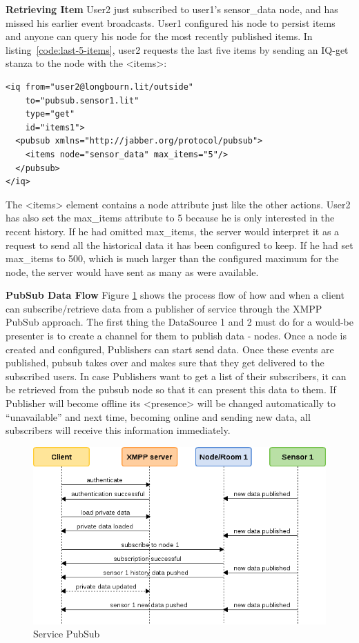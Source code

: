 \textbf{Retrieving Item}
\newline
User2 just subscribed to user1's sensor\_data node, and has missed his earlier event broadcasts.  User1 configured his node to persist items and anyone can query his node for the most recently published items. In listing~\ref{code:last-5-items}, user2 requests the last five items by sending an IQ-get stanza to the node with the <items>:
\begin{lstlisting}[label=code:last-5-items,caption=PubSub: requesting last 5 items from history]
<iq from="user2@longbourn.lit/outside"
    to="pubsub.sensor1.lit"
    type="get"
    id="items1">
  <pubsub xmlns="http://jabber.org/protocol/pubsub">
    <items node="sensor_data" max_items="5"/>
  </pubsub>
</iq>
\end{lstlisting}
The <items> element contains a node attribute just like the other actions. User2 has also set the max\_items attribute to 5 because he is only interested in the recent history. If he had omitted max\_items, the server would interpret it as a request to send all the historical data it has been configured to keep. If he had set max\_items to 500, which is much larger than the configured maximum for the node, the server would have sent as many as were available.

\textbf{PubSub Data Flow}
\newline
Figure \ref{img:pub_sub} shows the process flow of how and when a client can subscribe/retrieve data from a publisher of service through the XMPP PubSub approach. The first thing the DataSource 1 and 2 must do for a would-be presenter is to create a channel for them to publish data - nodes. Once a node is created and configured, Publishers can start send data. Once these events are published, pubsub takes over and makes sure that they get delivered to the subscribed users. In case Publishers want to get a list of their subscribers, it can be retrieved from the pubsub node so that it can present this data to them. If Publisher will become offline its <presence> will be changed automatically to ``unavailable'' and next time, becoming online and sending new data, all subscribers will receive this information immediately.
    \begin{figure}[!ht]
    \centering
    \includegraphics[scale=0.7]{images/PubSub.png}   
    \caption[Service PubSub]{Service PubSub}
    \label{img:pub_sub}                           
    \end{figure}
	    
